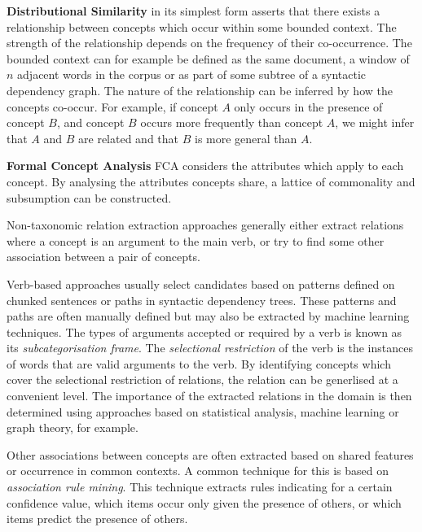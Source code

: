 \documentclass[a4paper]{report}
\begin{document}
{\bfseries Distributional Similarity} in its simplest form asserts that there exists a relationship between concepts which occur within some bounded context.
The strength of the relationship depends on the frequency of their co-occurrence.
The bounded context can for example be defined as the same document, a window of $n$ adjacent words in the corpus or as part of some subtree of a syntactic dependency graph.
The nature of the relationship can be inferred by how the concepts co-occur.
For example, if concept $A$ only occurs in the presence of concept $B$, and concept $B$ occurs more frequently than concept $A$, we might infer that $A$ and $B$ are related and that $B$ is more general than $A$.

{\bfseries Formal Concept Analysis} 
FCA considers the attributes which apply to each concept.
By analysing the attributes concepts share, a lattice of commonality and subsumption can be constructed.

\medskip

Non-taxonomic relation extraction approaches generally either extract relations where a concept is an argument to the main verb, or try to find some other association between a pair of concepts.

Verb-based approaches usually select candidates based on patterns defined on chunked sentences or paths in syntactic dependency trees.
These patterns and paths are often manually defined but may also be extracted by machine learning techniques.
The types of arguments accepted or required by a verb is known as its \emph{subcategorisation frame}.
The \emph{selectional restriction} of the verb is the instances of words that are valid arguments to the verb.
By identifying concepts which cover the selectional restriction of relations, the relation can be generlised at a convenient level.
The importance of the extracted relations in the domain is then determined using approaches based on statistical analysis, machine learning or graph theory, for example.

Other associations between concepts are often extracted based on shared features or occurrence in common contexts.
A common technique for this is based on \emph{association rule mining}.
This technique extracts rules indicating for a certain confidence value, which items occur only given the presence of others, or which items predict the presence of others.

\end{document}
